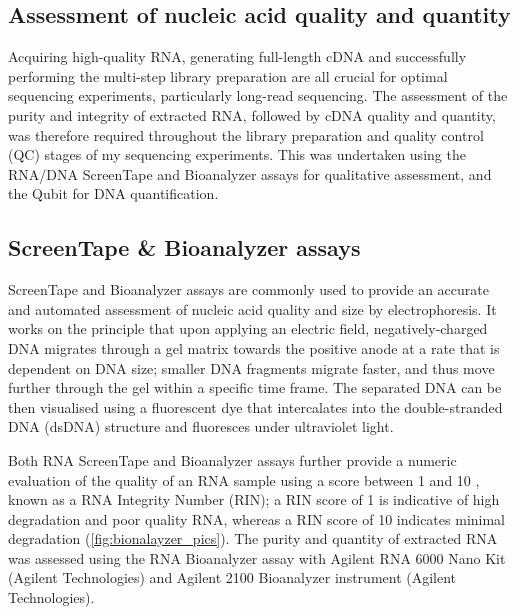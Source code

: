 \subsection{Assessment of nucleic acid quality and quantity}
Acquiring high-quality RNA, generating full-length cDNA and successfully performing the multi-step library preparation are all crucial for optimal sequencing experiments, particularly long-read sequencing. The assessment of the purity and integrity of extracted RNA, followed by cDNA quality and quantity, was therefore required throughout the library preparation and quality control (QC) stages of my sequencing experiments. This was undertaken using the RNA/DNA ScreenTape and Bioanalyzer assays for qualitative assessment, and the Qubit for DNA quantification. 


\subsection{ScreenTape \& Bioanalyzer assays}
\label{section:ch2_bioanalyzer} 
ScreenTape and Bioanalyzer assays are commonly used to provide an accurate and automated assessment of nucleic acid quality and size by electrophoresis. It works on the principle that upon applying an electric field, negatively-charged DNA migrates through a gel matrix towards the positive anode at a rate that is dependent on DNA size; smaller DNA fragments migrate faster, and thus move further through the gel within a specific time frame. The separated DNA can be then visualised using a fluorescent dye that intercalates into the double-stranded DNA (dsDNA) structure and fluoresces under ultraviolet light. 

Both RNA ScreenTape and Bioanalyzer assays further provide a numeric evaluation of the quality of an RNA sample using a score between 1 and 10 , known as a RNA Integrity Number (RIN); a RIN score of 1 is indicative of high degradation and poor quality RNA, whereas a RIN score of 10 indicates minimal degradation (\cref{fig:bionalayzer_pics}). The purity and quantity of extracted RNA was assessed using the RNA Bioanalyzer assay with Agilent RNA 6000 Nano Kit (Agilent Technologies) and Agilent 2100 Bioanalyzer instrument (Agilent Technologies). 

